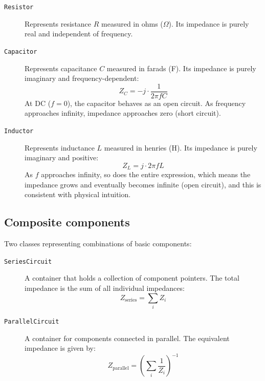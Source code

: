 \documentclass{article}
\begin{document}
    \begin{description}
        \item[\texttt{Resistor}] Represents resistance $R$ measured in ohms ($\Omega$). Its impedance is purely real and independent of frequency.
        
        \item[\texttt{Capacitor}] Represents capacitance $C$ measured in farads (F). Its impedance is purely imaginary and frequency-dependent:
        \begin{equation}
            Z_C = -j \cdot \frac{1}{2\pi f C}
        \end{equation}
        At DC ($f = 0$), the capacitor behaves as an open circuit. As frequency approaches infinity, impedance approaches zero (short circuit).

        \item[\texttt{Inductor}] Represents inductance $L$ measured in henries (H). Its impedance is purely imaginary and positive:
        \begin{equation}
            Z_L = j \cdot 2\pi f L
        \end{equation}
        As $f$ approaches infinity, so does the entire expression, which means the impedance grows and eventually becomes infinite (open circuit), and this is consistent with physical intuition. 
    \end{description}

    \subsection{Composite components}
    Two classes representing combinations of basic components:

    \begin{description}
        \item[\texttt{SeriesCircuit}] A container that holds a collection of component pointers. The total impedance is the sum of all individual impedances:
        \begin{equation}
            Z_{\text{series}} = \sum_i Z_i
        \end{equation}

        \item[\texttt{ParallelCircuit}] A container for components connected in parallel. The equivalent impedance is given by:
        \begin{equation}
            Z_{\text{parallel}} = \left( \sum_i \frac{1}{Z_i} \right)^{-1}
        \end{equation}
    \end{description}
\end{document}
